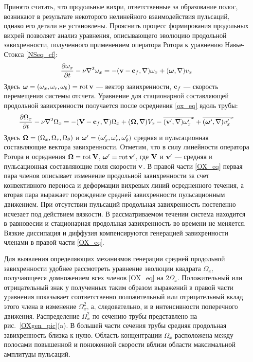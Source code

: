 Принято считать, что продольные вихри, ответственные за образование полос, возникают в результате некоторого нелинейного взаимодействия пульсаций, однако его детали не установлены. Прояснить процесс формирования продольных вихрей позволяет анализ уравнения, описывающего эволюцию продольной завихренности, полученного применением оператора Ротора к уравнению Навье-Стокса \eqref{NSeq_cf}:
\begin{equation}\label{ox_eq}
\frac{\partial \omega_x}{\partial t} - \nu\nabla^2 \omega_x =  -  (\mathbf{v} - \mathbf{c}_f, \nabla) \omega_x + (\mbox{\boldmath$\omega$}, \nabla) v_x
\end{equation}
Здесь $\mbox{\boldmath$\omega$} = (\omega_x, \omega_r, \omega_\theta) = \operatorname{rot} \mathbf{v}$ --- вектор завихренности, $\mathbf{c}_f$ --- скорость перемещения системы отсчета. Уравнение для стационарной составляющей продольной завихренности получается после осреднения \eqref{ox_eq} вдоль трубы:
\begin{equation}\label{OX_eq}
\frac{\partial \Omega_x}{\partial t} - \nu\nabla^2 \Omega_x = - (\mathbf{V} - \mathbf{c}_f, \nabla) \Omega_x + (\mbox{\boldmath$\Omega$}, \nabla) V_x - \overline{(\mathbf{v}', \nabla) \omega'_x}^x + \overline{ (\mbox{\boldmath$\omega$}', \nabla) v'_x }^x
\end{equation}
Здесь  $\mbox{\boldmath$\Omega$}=(\Omega_x, \Omega_r, \Omega_\theta)$ и $\mbox{\boldmath$\omega$}'=(\omega'_x, \omega'_r, \omega'_\theta)$ средняя и пульсационная составляющие вектора завихренности. Отметим, что в силу линейности оператора Ротора и осреднения $\mbox{\boldmath$\Omega$} = \operatorname{rot} \mathbf{V}$, $\mbox{\boldmath$\omega$}' = \operatorname{rot} \mathbf{v}'$, где $\mathbf{V}$ и $\mathbf{v}'$ --- средняя и пульсационная составляющие поля скорости $\mathbf{v}$. В правой части \eqref{OX_eq} первая пара членов описывает изменение продольной завихренности за счет конвективного переноса и деформации вихревых линий осредненного течения, а вторая пара выражает порождение средней завихренности пульсационным движением. При отсутствии пульсаций продольная завихренность постепенно исчезает под действием вязкости. В рассматриваемом течении система находится в равновесии и стационарная продольная завихренность во времени не меняется. Вязкие диссипация и диффузия компенсируются генерацией завихренности членами в правой части \eqref{OX_eq}.

Для выявления определяющих механизмов генерации средней продольной завихренности удобнее рассмотреть уравнение эволюции квадрата $\Omega_x$, получающееся домножением всех членов \eqref{OX_eq} на $2\Omega_x$. Положительный или отрицательный знак у полученных таким образом выражений в правой части уравнения показывает соответственно положительный или отрицательный вклад этого члена в изменение $\Omega_x^2$, а, следовательно, и в интенсивности поперечного движения. Распределение $\Omega_x^2$ по сечению трубы представлено на рис.~\ref{OXgen_pic}(a). В большей части сечения трубы средняя продольная завихренность близка к нулю. Область концентрации $\Omega_x$ расположена между полосами повышенной и пониженной скорости вблизи области максимальной амплитуды пульсаций.

